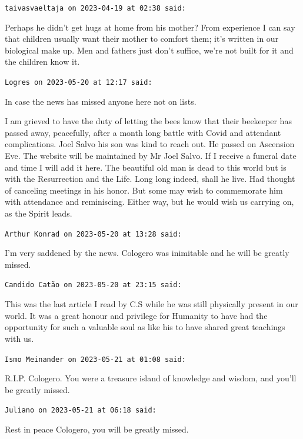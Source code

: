 \begin{footnotesize}
\begin{sffamily}
\texttt{taivasvaeltaja on 2023-04-19 at 02:38 said:}

Perhaps he didn't get hugs at home from his mother? From experience I can say that children usually want their mother to comfort them; it's written in our biological make up. Men and fathers just don't suffice, we're not built for it and the children know it.

\hfill

\texttt{Logres on 2023-05-20 at 12:17 said:}

In case the news has missed anyone here not on lists.

I am grieved to have the duty of letting the bees know that their beekeeper has passed away, peacefully, after a month long battle with Covid and attendant complications. Joel Salvo his son was kind to reach out. He passed on Ascension Eve. The website will be maintained by Mr Joel Salvo. If I receive a funeral date and time I will add it here. The beautiful old man is dead to this world but is with the Resurrection and the Life. Long long indeed, shall he live. Had thought of canceling meetings in his honor. But some may wish to commemorate him with attendance and reminiscing. Either way, but he would wish us carrying on, as the Spirit leads.

\hfill

\texttt{Arthur Konrad on 2023-05-20 at 13:28 said:}

I'm very saddened by the news. Cologero was inimitable and he will be greatly missed.

\hfill

\texttt{Candido Catão on 2023-05-20 at 23:15 said:}

This was the last article I read by C.S while he was still physically present in our world. It was a great honour and privilege for Humanity to have had the opportunity for such a valuable soul as like his to have shared great teachings with us.

\hfill

\texttt{Ismo Meinander on 2023-05-21 at 01:08 said:}

R.I.P. Cologero. You were a treasure island of knowledge and wisdom, and you'll be greatly missed.

\hfill

\texttt{Juliano on 2023-05-21 at 06:18 said:}

Rest in peace Cologero, you will be greatly missed.


\end{sffamily}
\end{footnotesize}
